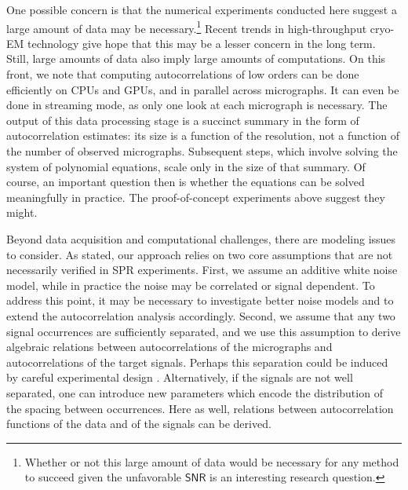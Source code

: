 \documentclass[english,11pt]{article}
\newcommand{\1}{\mathbf{1}}
\newcommand{\TODO}[1]{{\color{red}{[#1]}}}
\numberwithin{equation}{section}
\theoremstyle{plain}
\theoremstyle{definition}
\theoremstyle{remark}
\theoremstyle{plain}
\theoremstyle{remark}
\theoremstyle{plain}
\theoremstyle{plain}
\newcommand{\SNR}{\ensuremath{\textsf{SNR}}}
\begin{document}
One possible concern is that the numerical experiments conducted here suggest a large amount of data may be necessary.\footnote{Whether or not this large amount of data would be necessary for any method to succeed given the unfavorable $\SNR$ is an interesting research question.} Recent trends in high-throughput cryo-EM technology \TODO{?} give hope that this may be a lesser concern in the long term. Still, large amounts of data also imply large amounts of computations. On this front, we note that computing autocorrelations of low orders can be done efficiently on CPUs and GPUs, and in parallel across micrographs. It can even be done in streaming mode, as only one look at each micrograph is necessary. The output of this data processing stage is a succinct summary in the form of autocorrelation estimates: its size is a function of the resolution, not a function of the number of observed micrographs. Subsequent steps, which involve solving the system of polynomial equations, scale only in the size of that summary. Of course, an important question then is whether the equations can be solved meaningfully in practice. The proof-of-concept experiments above suggest they might.




Beyond data acquisition and computational challenges, there are modeling issues to consider.
As stated, our approach relies on two core assumptions that are not necessarily verified in SPR experiments.
First, we assume an additive white noise model, while in practice the noise may be correlated or signal dependent. To address this point, it may be necessary to investigate better noise models and to extend the autocorrelation analysis accordingly. \TODO{another issue is that micrographs also contain contaminants such as carbon, ice crystals, etc.. }
Second, we assume that any two signal occurrences are sufficiently separated, and we use this assumption to derive algebraic relations between autocorrelations of the micrographs and autocorrelations of the target signals. 
Perhaps this separation could be induced by careful experimental design \TODO{?}.
Alternatively, if the signals are not well separated, one can introduce new parameters which encode the distribution of the spacing between occurrences. Here as well, relations between autocorrelation functions of the data and of the signals can be derived.
\end{document}
